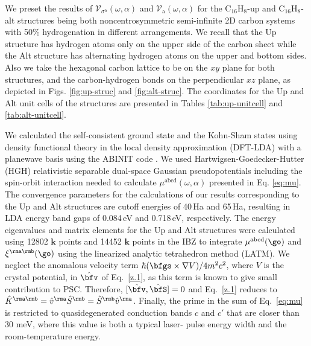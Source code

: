 \documentclass[floatfix,prb,aps,superscriptaddress,showpacs,11pt,preprint,letterpaper]{revtex4}
\begin{document}
We preset the results of $\mathcal{V}_{\sigma^{\mathrm{b}}}(\omega,\alpha)$ and
$\mathcal{V}_{\mathrm{a}}(\omega,\alpha)$ for the C$_{16}$H$_{8}$-up  and
C$_{16}$H$_{8}$-alt structures being both noncentrosymmetric semi-infinite 2D
carbon systems with 50\% hydrogenation in different arrangements. We recall
that the Up structure has hydrogen atoms only on the upper side of the carbon
sheet while the Alt structure has alternating hydrogen atoms on the upper and
bottom sides. Also we take the hexagonal carbon lattice to be on the $xy$ plane
for both structures, and the carbon-hydrogen bonds on the perpendicular $xz$
plane, as depicted in Figs. \ref{fig:up-struc} and \ref{fig:alt-struc}. The
coordinates for the Up and Alt unit cells of the structures are presented in
Tables \ref{tab:up-unitcell} and \ref{tab:alt-unitcell}.

We calculated the self-consistent ground state and the Kohn-Sham states using
density functional theory in the local density approximation (DFT-LDA) with a
planewave basis using the ABINIT code \cite{gonzeCPC09}.
% 
We used Hartwigsen-Goedecker-Hutter (HGH) relativistic separable dual-space
Gaussian pseudopotentials \cite{hartwigsenPRB98} including the spin-orbit
interaction needed to calculate $\mu^{\mathrm{abcd}}(\omega,\alpha)$ presented
in Eq. \eqref{eq:mu}.
% 
The convergence parameters for the calculations of our results corresponding to
the Up and Alt structures are cutoff energies of 40\,Ha and 65\,Ha, resulting
in LDA energy band gaps of 0.084\,eV and 0.718\,eV, respectively. The energy
eigenvalues and matrix elements for the Up and Alt structures were calculated
using 12802 $\mathbf{k}$ points and 14452 $\mathbf{k}$ points in the IBZ to
integrate $\mu^{\mathrm{abcd}}(\go)$ and $\xi^{\rma\rmb}(\go)$ using the
linearized analytic tetrahedron method (LATM).\cite{nastosPRB07} We neglect the
anomalous velocity term $\hbar(\bfgs\times\nabla V)/4m^2c^2$, where $V$ is the
crystal potential, in $\hat\bfv$ of Eq.~\eqref{z.1}, as this term is known to
give small contribution to PSC.\cite{bhatPRL05} Therefore,
$[\hat\bfv,\hat\bfS]=0$ and Eq.~\eqref{z.1} reduces to $\hat K^{\rma\rmb}=\hat
v^\rma \hat S^\rmb=\hat S^\rmb \hat v^\rma$. Finally, the prime in the sum of
Eq.~\eqref{eq:mu} is restricted to quasidegenerated conduction bands $c$ and
$c'$ that are closer than 30 meV, where this value is both a typical laser-
pulse energy width and the room-temperature energy.\cite{nastosPRB07}
% 
\end{document}
